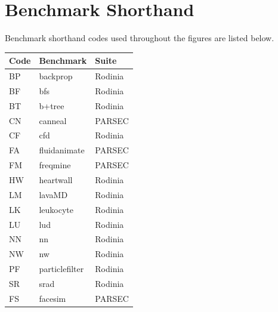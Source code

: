 \section{Benchmark Shorthand} \label{app:shorthand}

Benchmark shorthand codes used throughout the figures are listed below.

\begin{center}
\begin{tabular}{|l|l|l|}
\hline
\textbf{Code} & \textbf{Benchmark} & \textbf{Suite} \\
\hline
BP & backprop       & Rodinia \\
\hline
BF & bfs            & Rodinia \\
\hline
BT & b+tree         & Rodinia \\
\hline
CN & canneal        & PARSEC \\
\hline
CF & cfd            & Rodinia \\
\hline
FA & fluidanimate   & PARSEC \\
\hline
FM & freqmine       & PARSEC \\
\hline
HW & heartwall      & Rodinia \\
\hline
LM & lavaMD         & Rodinia \\
\hline
LK & leukocyte      & Rodinia \\
\hline
LU & lud            & Rodinia \\
\hline
NN & nn             & Rodinia \\
\hline
NW & nw             & Rodinia \\
\hline
PF & particlefilter & Rodinia \\
\hline
SR & srad           & Rodinia \\
\hline
FS & facesim        & PARSEC \\
\hline
\end{tabular}
\end{center}
